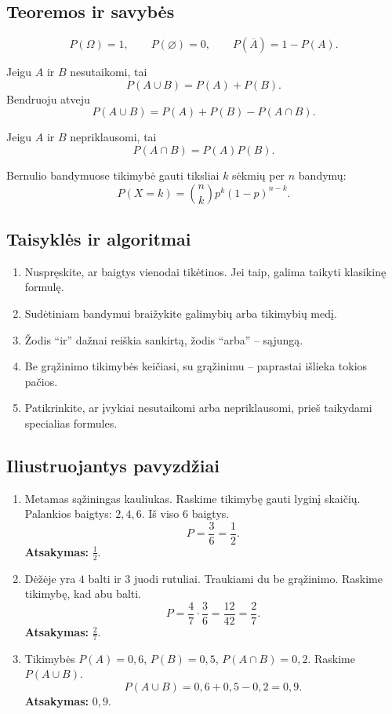 \subsection{Teoremos ir savybės}
\begin{savybe}
\[
P(\Omega)=1,\qquad P(\varnothing)=0,\qquad P(\overline A)=1-P(A).
\]
\end{savybe}
\begin{savybe}
Jeigu \(A\) ir \(B\) nesutaikomi, tai
\[
P(A\cup B)=P(A)+P(B).
\]
Bendruoju atveju
\[
P(A\cup B)=P(A)+P(B)-P(A\cap B).
\]
\end{savybe}
\begin{savybe}
Jeigu \(A\) ir \(B\) nepriklausomi, tai
\[
P(A\cap B)=P(A)P(B).
\]
\end{savybe}
\begin{savybe}
Bernulio bandymuose tikimybė gauti tiksliai \(k\) sėkmių per \(n\) bandymų:
\[
P(X=k)=\binom nk p^k(1-p)^{n-k}.
\]
\end{savybe}

\subsection{Taisyklės ir algoritmai}
\begin{enumerate}[label=\arabic*.]
\item Nuspręskite, ar baigtys vienodai tikėtinos. Jei taip, galima taikyti klasikinę formulę.
\item Sudėtiniam bandymui braižykite galimybių arba tikimybių medį.
\item Žodis ``ir'' dažnai reiškia sankirtą, žodis ``arba'' -- sąjungą.
\item Be grąžinimo tikimybės keičiasi, su grąžinimu -- paprastai išlieka tokios pačios.
\item Patikrinkite, ar įvykiai nesutaikomi arba nepriklausomi, prieš taikydami specialias formules.
\end{enumerate}

\subsection{Iliustruojantys pavyzdžiai}
\begin{enumerate}[label=\arabic*.]
\item Metamas sąžiningas kauliukas. Raskime tikimybę gauti lyginį skaičių.
Palankios baigtys: \(2,4,6\). Iš viso \(6\) baigtys.
\[
P=\frac36=\frac12.
\]
\textbf{Atsakymas:} \(\frac12\).

\item Dėžėje yra \(4\) balti ir \(3\) juodi rutuliai. Traukiami du be grąžinimo. Raskime tikimybę, kad abu balti.
\[
P=\frac47\cdot\frac36=\frac{12}{42}=\frac27.
\]
\textbf{Atsakymas:} \(\frac27\).

\item Tikimybės \(P(A)=0{,}6\), \(P(B)=0{,}5\), \(P(A\cap B)=0{,}2\). Raskime \(P(A\cup B)\).
\[
P(A\cup B)=0{,}6+0{,}5-0{,}2=0{,}9.
\]
\textbf{Atsakymas:} \(0{,}9\).
\end{enumerate}

